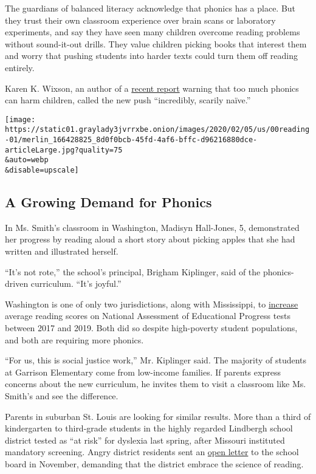 The guardians of balanced literacy acknowledge that phonics has a place.
But they trust their own classroom experience over brain scans or
laboratory experiments, and say they have seen many children overcome
reading problems without sound-it-out drills. They value children
picking books that interest them and worry that pushing students into
harder texts could turn them off reading entirely.

Karen K. Wixson, an author of a
\href{https://www.literacyworldwide.org/docs/default-source/where-we-stand/ila-children-experiencing-reading-difficulties.pdf}{recent
report} warning that too much phonics can harm children, called the new
push ``incredibly, scarily naïve.''

\texttt{[image: https://static01.graylady3jvrrxbe.onion/images/2020/02/05/us/00reading-01/merlin\_166428825\_8d0f0bcb-45fd-4af6-bffc-d96216880dce-articleLarge.jpg?quality=75\\\&auto=webp\\\&disable=upscale]}

\hypertarget{a-growing-demand-for-phonics}{%
\subsection{A Growing Demand for
Phonics}\label{a-growing-demand-for-phonics}}

In Ms. Smith's classroom in Washington, Madisyn Hall-Jones, 5,
demonstrated her progress by reading aloud a short story about picking
apples that she had written and illustrated herself.

``It's not rote,'' the school's principal, Brigham Kiplinger, said of
the phonics-driven curriculum. ``It's joyful.''

Washington is one of only two jurisdictions, along with Mississippi, to
\href{https://www.nationsreportcard.gov/mathematics/supportive_files/2019_infographic.pdf}{increase}
average reading scores on National Assessment of Educational Progress
tests between 2017 and 2019. Both did so despite high-poverty student
populations, and both are requiring more phonics.

``For us, this is social justice work,'' Mr. Kiplinger said. The
majority of students at Garrison Elementary come from low-income
families. If parents express concerns about the new curriculum, he
invites them to visit a classroom like Ms. Smith's and see the
difference.

Parents in suburban St. Louis are looking for similar results. More than
a third of kindergarten to third-grade students in the highly regarded
Lindbergh school district tested as ``at risk'' for dyslexia last
spring, after Missouri instituted mandatory screening. Angry district
residents sent an
\href{https://docs.google.com/document/d/17PZ1w1TEjcSZnlhCCnyAld6rF3X3pdNjTpOhPE4YuD8/edit?fbclid=IwAR25mkkUcWVAogUBwTQ3cl6VWXjdRwW9wi5Igk6J2SdgFGXCMImSMR2d5eY}{open
letter} to the school board in November, demanding that the district
embrace the science of reading.

